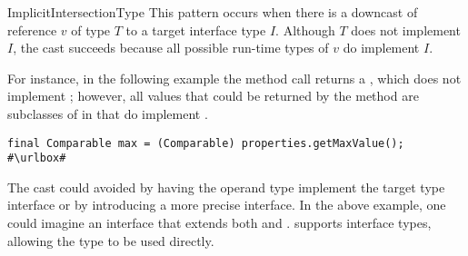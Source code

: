 \begin{pattern}{ImplicitIntersectionType}
This pattern occurs when there is a downcast of reference $v$ of type $T$ to a
target
interface type $I$.
Although $T$ does not implement $I$, 
the cast succeeds because all possible run-time types of $v$
do implement $I$.

\instances{}
For instance, in the following example%
\def\urlvar{http://bit.ly/senbox_org_snap_desktop_2FQOt4v}
the method call returns a , which does not implement
; however,
all values that could be returned by the method
are subclasses of  in 
that do implement .

\begin{verbatim}
final Comparable max = (Comparable) properties.getMaxValue();
#\urlbox#
\end{verbatim}



\issues{}
The cast could avoided by having the operand type implement the target type
  interface or by introducing a more precise interface.
  In the above example, one could imagine an interface
   that extends both  and
  . \scala{} supports
  interface types, allowing 
  the type 
  to be used directly.

\end{pattern}